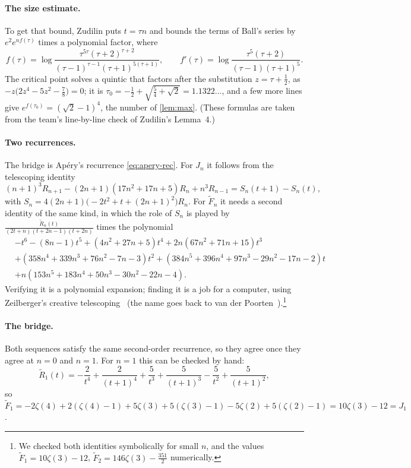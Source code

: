 \documentclass[11pt]{article}
\theoremstyle{plain}
\theoremstyle{definition}
\theoremstyle{remark}
\begin{document}
\paragraph{The size estimate.} To get that bound, Zudilin puts $t=\tau n$ and bounds the terms of
Ball's series by $e^2e^{nf(\tau)}$ times a polynomial factor, where
\[
  f(\tau)=\log\frac{\tau^{5\tau}(\tau+2)^{\tau+2}}{(\tau-1)^{\tau-1}(\tau+1)^{5(\tau+1)}},\qquad
  f'(\tau)=\log\frac{\tau^5(\tau+2)}{(\tau-1)(\tau+1)^5}.
\]
The critical point solves a quintic that factors after the substitution $z=\tau+\frac12$, as
$-z\bigl(2z^4-5z^2-\frac78\bigr)=0$; it is $\tau_0=-\frac12+\sqrt{\frac54+\sqrt2}=1.1322\ldots$, and a few
more lines give $e^{f(\tau_0)}=(\sqrt2-1)^4$, the number of \cref{lem:max}. (These formulas are
taken from the team's line-by-line check of Zudilin's Lemma~4.)

\paragraph{Two recurrences.} The bridge is Ap\'ery's recurrence \eqref{eq:apery-rec}.
For $J_n$ it follows from the telescoping identity
\[
  (n+1)^3R_{n+1}-(2n+1)(17n^2+17n+5)R_n+n^3R_{n-1}=S_n(t+1)-S_n(t),
\]
with $S_n=4(2n+1)\bigl(-2t^2+t+(2n+1)^2\bigr)R_n$.
For $\widetilde F_n$ it needs a second identity of the same kind, in which the role of $S_n$ is
played by $\frac{\widetilde R_n(t)}{(2t+n)(t+2n-1)(t+2n)}$ times the polynomial
\begin{align*}
&-t^6-(8n-1)t^5+(4n^2+27n+5)t^4+2n(67n^2+71n+15)t^3\\
&+(358n^4+339n^3+76n^2-7n-3)t^2+(384n^5+396n^4+97n^3-29n^2-17n-2)t\\
&+n(153n^5+183n^4+50n^3-30n^2-22n-4).
\end{align*}
Verifying it is a polynomial expansion; finding it is a job for a computer, using Zeilberger's
creative telescoping~\cite{zeilberger} (the name goes back to van der Poorten~\cite{vdp}).\footnote{We checked
both identities symbolically for small $n$, and the values $\widetilde F_1=10\zeta(3)-12$,
$\widetilde F_2=146\zeta(3)-\frac{351}2$ numerically.}

\paragraph{The bridge.} Both sequences satisfy the same second-order recurrence, so they agree once
they agree at $n=0$ and $n=1$. For $n=1$ this can be checked by hand:
\[
  \widetilde R_1(t)=-\frac2{t^4}+\frac2{(t+1)^4}+\frac5{t^3}+\frac5{(t+1)^3}-\frac5{t^2}+\frac5{(t+1)^2},
\]
so $\widetilde F_1=-2\zeta(4)+2(\zeta(4)-1)+5\zeta(3)+5(\zeta(3)-1)-5\zeta(2)+5(\zeta(2)-1)=10\zeta(3)-12=J_1$.
\end{document}

